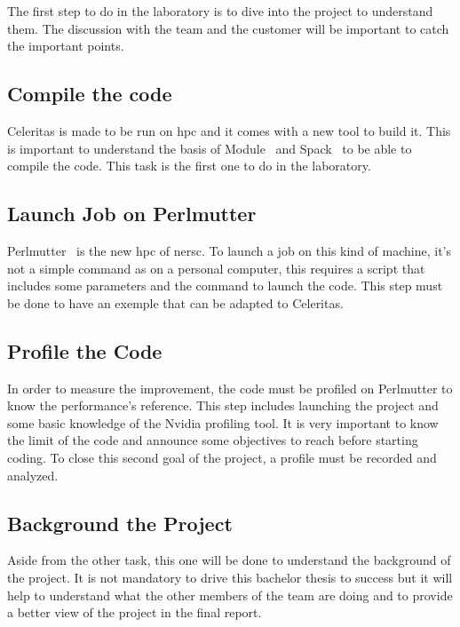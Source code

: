 The first step to do in the laboratory is to dive into the project to understand them.
The discussion with the team and the customer will be important to catch the important points.


\subsection{Compile the code}
\label{spec:ch:activities:understand-the-project:compile-the-code}

Celeritas is made to be run on \acrshort{hpc} and it comes with a new tool to build it.
This is important to understand the basis of Module~\cite{Module} and Spack~\cite{Spack} to be able to compile the code.
This task is the first one to do in the laboratory.


\subsection{Launch Job on Perlmutter}
\label{spec:ch:activities:understand-the-project:launch-job-on-perlmutter}
Perlmutter~\cite{Perlmutter} is the new \acrshort{hpc} of \acrshort{nersc}.
To launch a job on this kind of machine, it's not a simple command as on a personal computer, this requires a script that includes some parameters and the command to launch the code.
This step must be done to have an exemple that can be adapted to Celeritas.


\subsection{Profile the Code}
\label{specspec:ch:activities:understand-the-project:profile-the-code}

In order to measure the improvement, the code must be profiled on Perlmutter to know the performance's reference.
This step includes launching the project and some basic knowledge of the Nvidia profiling tool.
It is very important to know the limit of the code and announce some objectives to reach before starting coding.
To close this second goal of the project, a profile must be recorded and analyzed.


\subsection{Background the Project}
\label{spec:ch:activities:understand-the-project:background-the-project}

Aside from the other task, this one will be done to understand the background of the project.
It is not mandatory to drive this bachelor thesis to success but it will help to understand what the other members of the team are doing and to provide a better view of the project in the final report.



